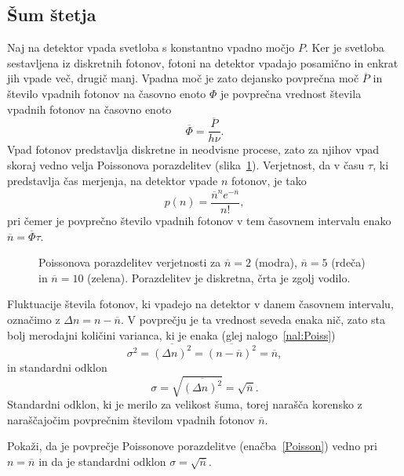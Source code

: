 \subsection*{Šum štetja} 
Naj na detektor vpada svetloba s konstantno vpadno 
močjo $P$. Ker je svetloba sestavljena iz diskretnih fotonov, 
fotoni na detektor vpadajo posamično in enkrat jih vpade več, 
drugič manj. Vpadna moč je zato dejansko povprečna moč $\overline{P}$ in število 
vpadnih fotonov na časovno enoto $\Phi$ je povprečna vrednost števila vpadnih fotonov na časovno enoto
\begin{equation}
\overline{\Phi} = \frac{\overline{P}}{h\nu}.
\end{equation}
Vpad fotonov predstavlja diskretne in neodvisne procese, zato za njihov vpad skoraj vedno velja
Poissonova porazdelitev (slika~\ref{11_Poiss}). Verjetnost, da v času $\tau$, ki predstavlja 
čas merjenja, na detektor vpade $n$ fotonov, je tako 
\begin{equation}
p(n) = \frac{\overline{n}^n e^{-\overline{n}}}{n!},
\label{Poisson}
\end{equation}
pri čemer je povprečno število vpadnih fotonov v tem časovnem intervalu 
enako $\overline{n} = \overline{\Phi}\tau$.
\begin{figure}[h]
\centering
\def\svgwidth{90truemm} 

\caption{Poissonova porazdelitev verjetnosti za $\overline{n}=2$ (modra), 
$\overline{n}=5$ (rdeča) in $\overline{n}=10$ (zelena). Porazdelitev je 
diskretna, črta je zgolj vodilo.}
\label{11_Poiss}
\end{figure}

Fluktuacije števila fotonov, ki vpadejo na detektor v danem časovnem 
intervalu, označimo z $\Delta n = n-\overline{n}$. V povprečju je ta vrednost seveda enaka nič, 
zato sta bolj merodajni količini varianca, ki je enaka (glej nalogo~\ref{nal:Poiss})
\begin{equation}
\sigma^2 = \overline{(\Delta n)^2}= \overline{(n-\overline{n})^2} = \overline{n},
\label{varianca}
\end{equation}
in standardni odklon
\begin{equation}
\sigma = \sqrt{\overline{(\Delta n)^2}} = \sqrt{\overline{n}}.
\label{sigma}
\end{equation}
Standardni odklon, ki je merilo za velikost šuma, torej narašča korensko 
z naraščajočim povprečnim številom vpadnih fotonov $\overline{n}$. 
\begin{naloga}
Pokaži, da je povprečje Poissonove porazdelitve (enačba~\ref{Poisson}) vedno pri $n = \overline{n}$
in da je standardni odklon $\sigma = \sqrt{\overline{n}}$.
\label{nal:Poiss}
\end{naloga}

